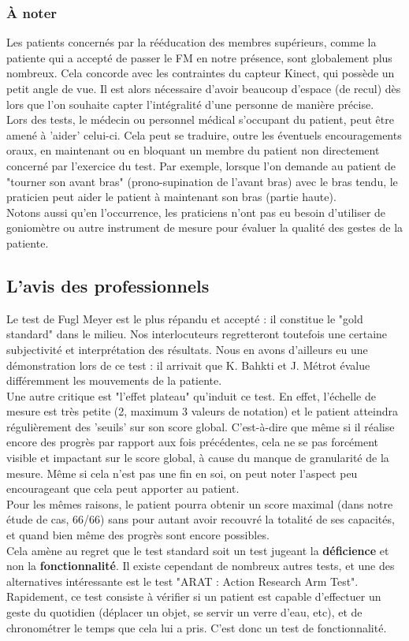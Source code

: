\documentclass[french,12pt]{report}
\begin{document}
				\subsubsection{À noter}
Les patients concernés par la rééducation des membres supérieurs, comme la patiente qui a accepté de passer 
le FM en notre présence, sont globalement plus nombreux. Cela concorde avec les contraintes du capteur Kinect, 
qui possède un petit angle de vue. Il est alors nécessaire d'avoir beaucoup d'espace (de recul) dès lors que 
l'on souhaite capter l'intégralité d'une personne de manière précise. \\
Lors des tests, le médecin ou personnel médical s'occupant du patient, peut être amené à 'aider' celui-ci.
Cela peut se traduire, outre les éventuels encouragements oraux, en maintenant ou en bloquant un membre du patient
non directement concerné par l'exercice du test. Par exemple, lorsque l'on demande au patient de "tourner son avant 
bras" (prono-supination de l'avant bras) avec le bras tendu, le praticien peut aider le patient à maintenant son bras
(partie haute).\\
Notons aussi qu'en l'occurrence, les praticiens n'ont pas eu besoin d'utiliser de goniomètre ou autre instrument de 
mesure pour évaluer la qualité des gestes de la patiente.
		
	\subsection{L'avis des professionnels}
	Le test de Fugl Meyer est le plus répandu et accepté : il constitue le "gold standard" dans le milieu.
	Nos interlocuteurs regretteront toutefois une certaine subjectivité et interprétation des résultats.
	Nous en avons d'ailleurs eu une démonstration lors de ce test : il arrivait que K. Bahkti et J. Métrot 
	évalue différemment les mouvements de la patiente. \\
Une autre critique est "l'effet plateau" qu'induit ce test. En effet, l'échelle de mesure est très petite 
(2, maximum 3 valeurs de notation) et le patient atteindra régulièrement des 'seuils' sur son score global. 
C'est-à-dire que même si il réalise encore des progrès par rapport aux fois précédentes, cela ne se pas forcément 
visible et impactant sur le score global, à cause du manque de granularité de la mesure. Même si cela n'est pas une 
fin en soi, on peut noter l'aspect peu encourageant que cela peut apporter au patient. \\
Pour les mêmes raisons, le patient pourra obtenir un score maximal (dans notre étude de cas, 66/66) sans pour autant
avoir recouvré la totalité de ses capacités, et quand bien même des progrès sont encore possibles. \\
Cela amène au regret que le test standard soit un test jugeant la \textbf{déficience} et non la \textbf{fonctionnalité}. 
Il existe cependant de nombreux autres tests, et une des alternatives intéressante est le test "ARAT : 
Action Research Arm Test". %
Rapidement, ce test consiste à vérifier si un patient est capable d'effectuer un geste du quotidien (déplacer
un objet, se servir un verre d'eau, etc), et de chronométrer le temps que cela lui a pris. C'est donc un test 
de fonctionnalité.
	
\end{document}
